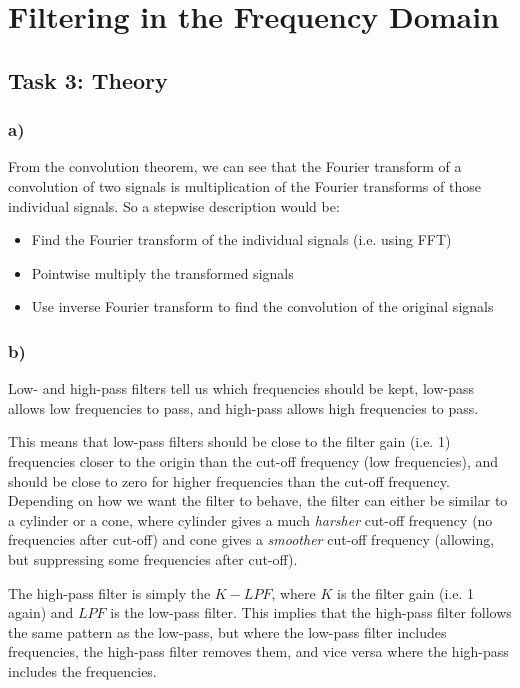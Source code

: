 \section{Filtering in the Frequency Domain}
\subsection{Task 3: Theory}
\subsubsection*{a)}
From the convolution theorem, we can see that the Fourier transform of a convolution of two signals is multiplication of the Fourier transforms of those individual signals. So a stepwise description would be: 
\begin{itemize}
    \item Find the Fourier transform of the individual signals (i.e. using FFT)
    \item Pointwise multiply the transformed signals
    \item Use inverse Fourier transform to find the convolution of the original signals
\end{itemize}

\subsubsection*{b)}
Low- and high-pass filters tell us which frequencies should be kept, low-pass allows low frequencies to pass, and high-pass allows high frequencies to pass. 

This means that low-pass filters should be close to the filter gain (i.e. 1) frequencies closer to the origin than the cut-off frequency (low frequencies), and should be close to zero for higher frequencies than the cut-off frequency. Depending on how we want the filter to behave, the filter can either be similar to a cylinder or a cone, where cylinder gives a much \textit{harsher} cut-off frequency (no frequencies after cut-off) and cone gives a \textit{smoother} cut-off frequency (allowing, but suppressing some frequencies after cut-off). 

The high-pass filter is simply the $K - LPF$, where $K$ is the filter gain (i.e. 1 again) and $LPF$ is the low-pass filter. This implies that the high-pass filter follows the same pattern as the low-pass, but where the low-pass filter includes frequencies, the high-pass filter removes them, and vice versa where the high-pass includes the frequencies. 


